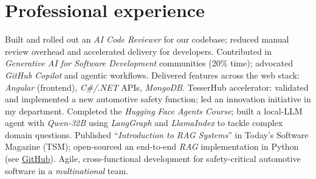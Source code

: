 %


\section{Professional experience}

{
\idea Built and rolled out an \emph{AI Code Reviewer} for our codebase; reduced manual review overhead and accelerated delivery for developers.
\idea Contributed in \emph{Generative AI for Software Development} communities (20\% time); advocated \emph{GitHub Copilot} and agentic workflows.
\idea Delivered features across the web stack: \emph{Angular} (frontend), \emph{C\#/.NET} APIs, \emph{MongoDB}.
\idea TesserHub accelerator: validated and implemented a new automotive safety function; led an innovation initiative in my department.
\idea Completed the \emph{Hugging Face Agents Course}; built a local-LLM agent with \emph{Qwen-32B} using \emph{LangGraph} and \emph{LlamaIndex} to tackle complex domain questions.
\idea Published “\emph{Introduction to RAG Systems}” in Today’s Software Magazine (TSM); open-sourced an end-to-end \emph{RAG} implementation in Python (see \href{https://github.com/24Arys11/RAG}{GitHub}).
\idea Agile, cross-functional development for safety-critical automotive software in a \emph{multinational} team.
}